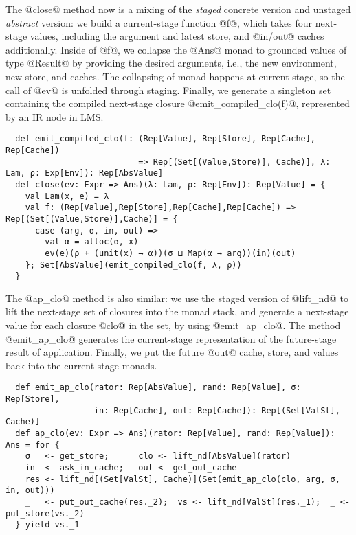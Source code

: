The @close@ method now is a mixing of the \textit{staged} concrete version and
unstaged \textit{abstract} version: we build a current-stage function @f@, which
takes four next-stage values, including the argument and latest store, and
@in/out@ caches additionally. Inside of @f@, we collapse the @Ans@ monad to
grounded values of type @Result@ by providing the desired arguments, i.e., the
new environment, new store, and caches. The collapsing of monad happens at
current-stage, so the call of @ev@ is unfolded through staging. Finally, we
generate a singleton set containing the compiled next-stage closure
@emit_compiled_clo(f)@, represented by an IR node in LMS.
\begin{lstlisting}
  def emit_compiled_clo(f: (Rep[Value], Rep[Store], Rep[Cache], Rep[Cache])
                           => Rep[(Set[(Value,Store)], Cache)], λ: Lam, ρ: Exp[Env]): Rep[AbsValue]
  def close(ev: Expr => Ans)(λ: Lam, ρ: Rep[Env]): Rep[Value] = {
    val Lam(x, e) = λ
    val f: (Rep[Value],Rep[Store],Rep[Cache],Rep[Cache]) => Rep[(Set[(Value,Store)],Cache)] = {
      case (arg, σ, in, out) =>
        val α = alloc(σ, x)
        ev(e)(ρ + (unit(x) → α))(σ ⊔ Map(α → arg))(in)(out)
    }; Set[AbsValue](emit_compiled_clo(f, λ, ρ))
  }
\end{lstlisting}

The @ap_clo@ method is also similar: we use the staged version of @lift_nd@ to
lift the next-stage set of closures into the monad stack, and generate a
next-stage value for each closure @clo@ in the set, by using @emit_ap_clo@. The
method @emit_ap_clo@ generates the current-stage representation of the
future-stage result of application.
Finally, we put the future @out@ cache, store, and values back into
the current-stage monads.
\begin{lstlisting}
  def emit_ap_clo(rator: Rep[AbsValue], rand: Rep[Value], σ: Rep[Store],
                  in: Rep[Cache], out: Rep[Cache]): Rep[(Set[ValSt], Cache)]
  def ap_clo(ev: Expr => Ans)(rator: Rep[Value], rand: Rep[Value]): Ans = for {
    σ   <- get_store;      clo <- lift_nd[AbsValue](rator)
    in  <- ask_in_cache;   out <- get_out_cache
    res <- lift_nd[(Set[ValSt], Cache)](Set(emit_ap_clo(clo, arg, σ, in, out)))
    _   <- put_out_cache(res._2);  vs <- lift_nd[ValSt](res._1);  _ <- put_store(vs._2)
  } yield vs._1
\end{lstlisting}

